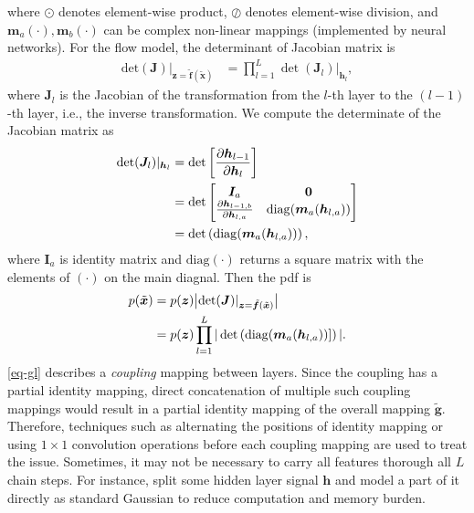 where $\odot$ denotes element-wise product, $\oslash$ denotes
element-wise division, and $\bm{m}_a(\cdot), \bm{m}_b(\cdot)$ can be
complex non-linear mappings (implemented by neural networks).
For the flow model, the determinant of Jacobian matrix is
\begin{equation}
  \begin{array}{rl}
    \mathrm{det}(\bm{J}) |_{\bm{z}=\tilde{\bm{f}}(\tilde{\bm{x}})} & = \prod_{l=1}^L \det (\bm{J}_l) |_{\bm{h}_{l}},
  \end{array}
\end{equation}
where $\bm{J}_l$ is the Jacobian of the transformation from the $l$-th layer to the $(l-1)$-th layer, i.e., the inverse transformation. We compute the determinate of the Jacobian matrix as
\begin{align}\label{eq-hl-determinate}
  \det (\bm{J}_l)|_{\bm{h}_{l}}& = \det \left[  \frac{ \partial \bm{h}_{l-1}}{\partial \bm{h}_l} \right] \nonumber\\
                               & = \det
                                 \begin{bmatrix}
                                   \bm{I}_a & \mathbf{0} \nonumber\\
                                   \frac{ \partial \bm{h}_{l-1,b}}{\partial \bm{h}_{l,a}} & \mathrm{diag}(\bm{m}_a(\bm{h}_{l,a}))
                                 \end{bmatrix}\nonumber\\
                               &= \det \left( \mathrm{diag}(\bm{m}_a(\bm{h}_{l,a})) \right),
\end{align}
where $\bm{I}_a$ is identity matrix and $\mathrm{diag}(\cdot)$ returns a square matrix with the elements of $(\cdot)$ on the main diagnal. Then the pdf is
\begin{align}
  p(\tilde{\bm{x}}) & =  p(\bm{z}) \big| \mathrm{det}(\bm{J}) |_{\bm{z}=\tilde{\bm{f}}(\tilde{\bm{x}})}\big| \nonumber\\
                    &  = p(\bm{z}) \prod_{l=1}^L | \det\left( \mathrm{diag}(\bm{m}_a(\bm{h}_{l,a}))]  \right) |.
\end{align}
\eqref{eq-gl} describes a \textit{coupling} mapping between layers. Since the coupling has a partial identity mapping, direct concatenation of multiple such coupling mappings would result in a partial identity mapping of the overall mapping $\tilde{\bm{g}}$. Therefore, techniques such as alternating the positions of identity mapping \cite{2016arXiv160508803D} or using $1\times1$ convolution operations \cite{2018arXiv180703039K} before each coupling mapping are used to treat the issue.
Sometimes, it may not be necessary to carry all features thorough all $L$ chain steps. For instance, \cite{2016arXiv160508803D}\cite{2018arXiv180703039K} split some hidden
layer signal $\bm{h}$ and model a part of it directly as standard Gaussian to reduce computation and memory burden.

